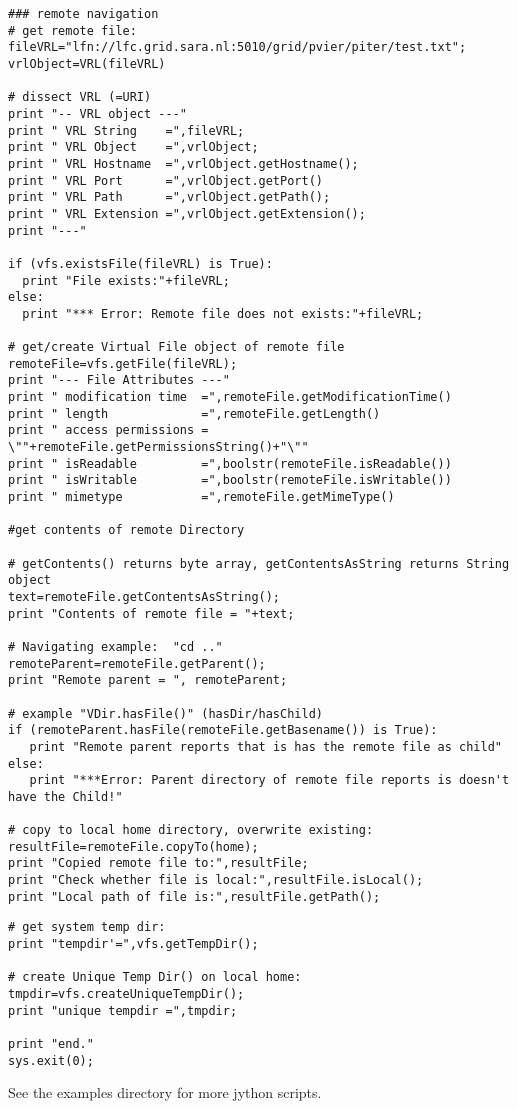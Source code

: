 \hspace*{5mm}\begin{boxedminipage}{165mm}
\begin{verbatim}
### remote navigation 
# get remote file:
fileVRL="lfn://lfc.grid.sara.nl:5010/grid/pvier/piter/test.txt"; 
vrlObject=VRL(fileVRL) 

# dissect VRL (=URI)
print "-- VRL object ---"
print " VRL String    =",fileVRL; 
print " VRL Object    =",vrlObject; 
print " VRL Hostname  =",vrlObject.getHostname(); 
print " VRL Port      =",vrlObject.getPort()
print " VRL Path      =",vrlObject.getPath(); 
print " VRL Extension =",vrlObject.getExtension(); 
print "---"

if (vfs.existsFile(fileVRL) is True):
  print "File exists:"+fileVRL; 
else:
  print "*** Error: Remote file does not exists:"+fileVRL; 

# get/create Virtual File object of remote file
remoteFile=vfs.getFile(fileVRL); 
print "--- File Attributes ---" 
print " modification time  =",remoteFile.getModificationTime()
print " length             =",remoteFile.getLength()
print " access permissions = \""+remoteFile.getPermissionsString()+"\"" 
print " isReadable         =",boolstr(remoteFile.isReadable()) 
print " isWritable         =",boolstr(remoteFile.isWritable()) 
print " mimetype           =",remoteFile.getMimeType()

#get contents of remote Directory 

# getContents() returns byte array, getContentsAsString returns String object 
text=remoteFile.getContentsAsString(); 
print "Contents of remote file = "+text; 

# Navigating example:  "cd .."  
remoteParent=remoteFile.getParent(); 
print "Remote parent = ", remoteParent; 

# example "VDir.hasFile()" (hasDir/hasChild)
if (remoteParent.hasFile(remoteFile.getBasename()) is True): 
   print "Remote parent reports that is has the remote file as child" 
else:
   print "***Error: Parent directory of remote file reports is doesn't have the Child!" 

# copy to local home directory, overwrite existing: 
resultFile=remoteFile.copyTo(home);
print "Copied remote file to:",resultFile; 
print "Check whether file is local:",resultFile.isLocal();
print "Local path of file is:",resultFile.getPath(); 
\end{verbatim}
\end{boxedminipage}


\hspace*{5mm}\begin{boxedminipage}{165mm}
\begin{verbatim}
# get system temp dir: 
print "tempdir'=",vfs.getTempDir(); 

# create Unique Temp Dir() on local home:
tmpdir=vfs.createUniqueTempDir(); 
print "unique tempdir =",tmpdir;

print "end."
sys.exit(0); 
\end{verbatim}
\end{boxedminipage}

See the examples directory  for more jython scripts. 

